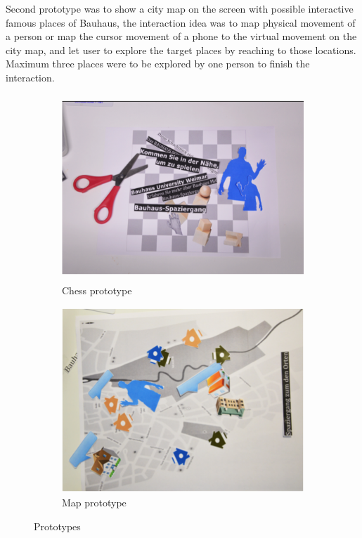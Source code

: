 Second prototype was to show a city map on the screen with possible interactive famous places of Bauhaus, the interaction idea was to map physical movement of a person or map the cursor movement of a phone to the virtual movement on the city map, and let user to explore the target places by reaching to those locations. Maximum three places were to be explored by one person to finish the interaction.


\begin{figure}[H]
    \centering
    \begin{subfigure}[H]{0.7\textwidth}
        \centering
        \includegraphics[width=\textwidth,height=7cm]{Figures/4/chess}
        \caption{Chess prototype }
        \label{fig:chesspro}
    \end{subfigure}
    \begin{subfigure}[H]{0.7\textwidth}
        \centering
        \includegraphics[width=\textwidth,height=7cm]{Figures/4/map}
        \caption{Map prototype}
        \label{fig:mapprot}
    \end{subfigure}
    \caption{Prototypes}
    \label{fig:map_chess_prototypes}
\end{figure}


